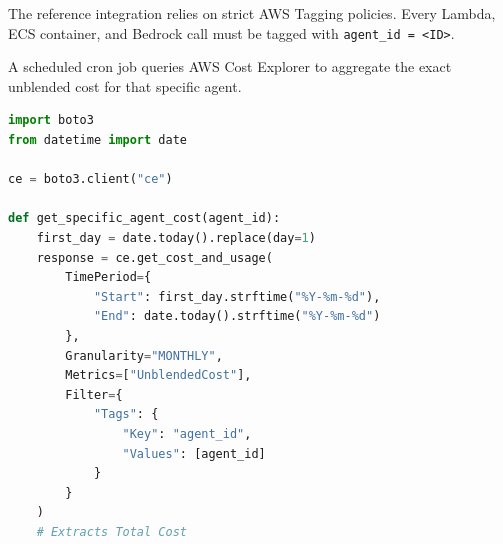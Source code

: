 \documentclass[11pt,a4paper]{article}
\begin{document}
The reference integration relies on strict AWS Tagging policies. Every Lambda, ECS container, and Bedrock call must be tagged with \texttt{agent\_id = <ID>}. 

A scheduled cron job queries AWS Cost Explorer to aggregate the exact unblended cost for that specific agent.

\vspace{0.5cm}
\begin{center}
\end{center}
\vspace{0.5cm}

\begin{lstlisting}[language=Python, caption={cost.py - boto3 extraction by agent\_id}]
import boto3
from datetime import date

ce = boto3.client("ce")

def get_specific_agent_cost(agent_id):
    first_day = date.today().replace(day=1)
    response = ce.get_cost_and_usage(
        TimePeriod={
            "Start": first_day.strftime("%Y-%m-%d"),
            "End": date.today().strftime("%Y-%m-%d")
        },
        Granularity="MONTHLY",
        Metrics=["UnblendedCost"],
        Filter={
            "Tags": {
                "Key": "agent_id",
                "Values": [agent_id]
            }
        }
    )
    # Extracts Total Cost
\end{lstlisting}

\newpage

\end{document}
